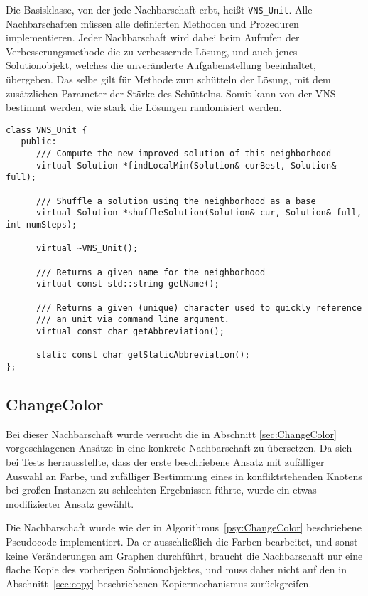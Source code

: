 Die Basisklasse, von der jede Nachbarschaft erbt, heißt \texttt{VNS\_Unit}. Alle Nachbarschaften müssen alle definierten Methoden und Prozeduren implementieren. Jeder Nachbarschaft wird dabei beim Aufrufen der
Verbesserungsmethode die zu verbessernde Lösung, und auch jenes Solutionobjekt, welches die unveränderte Aufgabenstellung beeinhaltet, übergeben. Das selbe gilt für Methode zum schütteln der Lösung, mit dem
zusätzlichen Parameter der Stärke des Schüttelns. Somit kann von der VNS bestimmt werden, wie stark die Lösungen randomisiert werden. 

\singlespacing
\begin{lstlisting}[caption={Signatur der Basisklasse \texttt{VNS\_Unit}, von welcher alle Nachbarschaften erben},label={lst:vnsunit}]
class VNS_Unit {
   public:
      /// Compute the new improved solution of this neighborhood
      virtual Solution *findLocalMin(Solution& curBest, Solution& full);

      /// Shuffle a solution using the neighborhood as a base
      virtual Solution *shuffleSolution(Solution& cur, Solution& full, int numSteps);
   
      virtual ~VNS_Unit();
      
      /// Returns a given name for the neighborhood
      virtual const std::string getName();

      /// Returns a given (unique) character used to quickly reference
      /// an unit via command line argument.
      virtual const char getAbbreviation();
      
      static const char getStaticAbbreviation();
};
\end{lstlisting}

\subsection{ChangeColor}
Bei dieser Nachbarschaft wurde versucht die in Abschnitt \ref{sec:ChangeColor} vorgeschlagenen Ansätze in eine konkrete Nachbarschaft zu übersetzen. Da sich bei Tests herrausstellte, dass der erste beschriebene Ansatz
mit zufälliger Auswahl an Farbe, und zufälliger Bestimmung eines in konfliktstehenden Knotens bei großen Instanzen zu schlechten Ergebnissen führte, wurde ein etwas modifizierter Ansatz gewählt.

Die Nachbarschaft wurde wie der in Algorithmus~\ref{psy:ChangeColor} beschriebene Pseudocode implementiert. Da er ausschließlich die Farben bearbeitet, und sonst keine Veränderungen am Graphen durchführt,
braucht die Nachbarschaft nur eine flache Kopie des vorherigen Solutionobjektes, und muss daher nicht auf den in Abschnitt~\ref{sec:copy} beschriebenen Kopiermechanismus zurückgreifen. 

